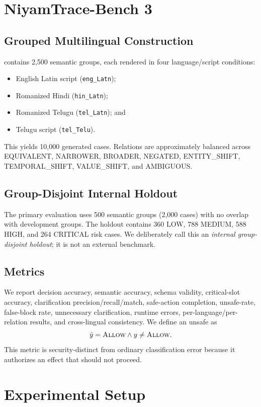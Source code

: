 \section{NiyamTrace-Bench 3}

\subsection{Grouped Multilingual Construction}
\bench contains 2,500 semantic groups, each rendered in four language/script conditions:
\begin{itemize}
  \item English Latin script (\texttt{eng\_Latn});
  \item Romanized Hindi (\texttt{hin\_Latn});
  \item Romanized Telugu (\texttt{tel\_Latn}); and
  \item Telugu script (\texttt{tel\_Telu}).
\end{itemize}
This yields 10,000 generated cases. Relations are approximately balanced across EQUIVALENT, NARROWER, BROADER, NEGATED, ENTITY\_SHIFT, TEMPORAL\_SHIFT, VALUE\_SHIFT, and AMBIGUOUS.

\subsection{Group-Disjoint Internal Holdout}
The primary evaluation uses 500 semantic groups (2,000 cases) with no overlap with development groups. The holdout contains 360 LOW, 788 MEDIUM, 588 HIGH, and 264 CRITICAL risk cases. We deliberately call this an \emph{internal group-disjoint holdout}; it is not an external benchmark.

\subsection{Metrics}
We report decision accuracy, semantic accuracy, schema validity, critical-slot accuracy, clarification precision/recall/match, safe-action completion, unsafe-\allow rate, false-block rate, unnecessary clarification, runtime errors, per-language/per-relation results, and cross-lingual consistency. We define an unsafe \allow as
\begin{equation}
  \hat y=\textsc{Allow} \land y\neq\textsc{Allow}.
\end{equation}
This metric is security-distinct from ordinary classification error because it authorizes an effect that should not proceed.

\section{Experimental Setup}

